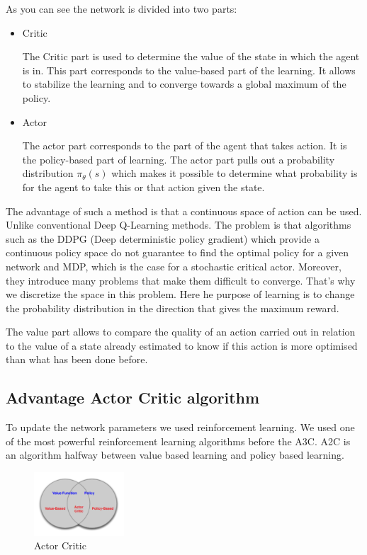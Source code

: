 As you can see the network is divided into two parts\cite{ANN}:
\begin{itemize}
    \item Critic 
    
    
    The Critic part is used to determine the value of the state in which the agent is in. 
    This part corresponds to the value-based part of the learning. It allows to stabilize the learning and to converge towards a global maximum of the policy.
    \item Actor
    
    
    The actor part corresponds to the part of the agent that takes action. It is the policy-based part of learning. 
    The actor part pulls out a probability distribution $\pi_{\theta}(s)$ which makes it possible to determine what probability is for the agent to take this or that action given the state.
  \end{itemize}
  The advantage of such a method is that a continuous space of action can be used.\cite{CONT}
  Unlike conventional Deep Q-Learning methods.\cite{DQN}
  The problem is that algorithms such as the DDPG (Deep deterministic policy gradient) which provide a continuous policy space do not guarantee to find the optimal policy for a given network and MDP, which is the case for a stochastic critical actor.
    Moreover, they introduce many problems that make them difficult to converge.\cite{DBLP}
    That's why we discretize the space in this problem.
    Here he purpose of learning is to change the probability distribution in the direction that gives the maximum reward. 

  The value part allows to compare the quality of an action carried out in relation to the value of a state already estimated to know if this action is more optimised than what has been done before.


\subsection{Advantage Actor Critic algorithm}

To update the network parameters we used reinforcement learning. We used one of the most powerful reinforcement learning algorithms before the A3C. A2C is an algorithm halfway between value based learning and policy based learning.
\begin{figure}[H]
    \centering
    \includegraphics[width=0.3\textwidth]{imgs/actro.png}
    \caption{\label{fig:method} Actor Critic}
\end{figure}

